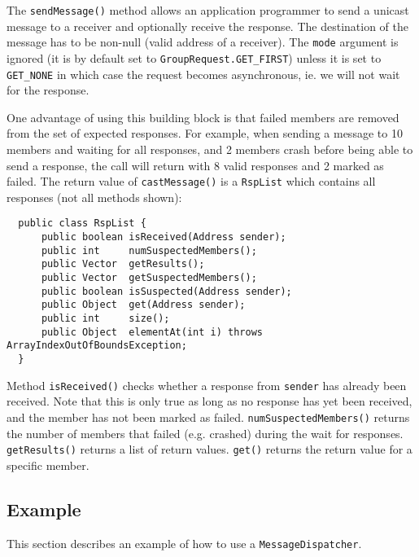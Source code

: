   The {\tt sendMessage()} method allows an application programmer to send a unicast
  message to a receiver and optionally receive the response. The destination of the
  message has to be non-null (valid address of a receiver). The {\tt mode} argument
  is ignored (it is by default set to {\tt GroupRequest.GET\_FIRST}) unless it is set
  to {\tt GET\_NONE} in which case the request becomes asynchronous, ie. we will not
  wait for the response.


  One advantage of using this building block is that failed members are removed from
  the set of expected responses. For example, when sending a message to 10 members and
  waiting for all responses, and 2 members crash before being able to send
  a response, the call will return with 8 valid responses and 2 marked as failed. The
  return value of {\tt castMessage()} is a {\tt RspList} which contains all responses
  (not all methods shown):

  \begin{small}
  \begin{verbatim}
  public class RspList {
      public boolean isReceived(Address sender);
      public int     numSuspectedMembers();
      public Vector  getResults();
      public Vector  getSuspectedMembers();
      public boolean isSuspected(Address sender);
      public Object  get(Address sender);
      public int     size();
      public Object  elementAt(int i) throws ArrayIndexOutOfBoundsException;
  }
  \end{verbatim}
  \end{small}

  Method {\tt isReceived()} checks whether a response from {\tt sender} has already
  been received. Note that this is only true as long as no response has yet been
  received, and the member has not been marked as failed. {\tt numSuspectedMembers()}
  returns the number of members that failed (e.g. crashed) during the wait for
  responses. {\tt getResults()} returns a list of return values. {\tt get()} returns
  the return value for a specific member.


    \subsection{Example}

    This section describes an example of how to use a {\tt MessageDispatcher}.

